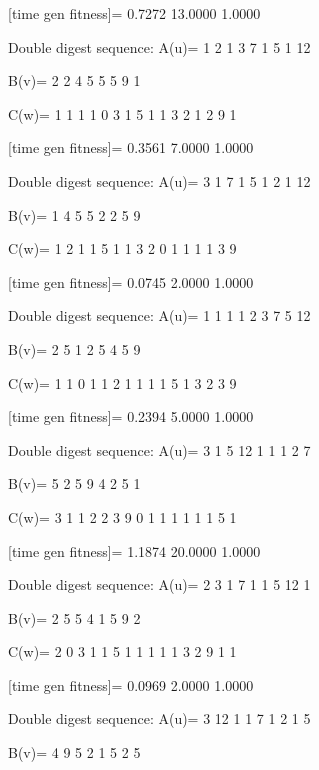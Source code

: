 [time gen fitness]=
    0.7272   13.0000    1.0000

Double digest sequence:
A(u)=
     1     2     1     3     7     1     5     1    12

B(v)=
     2     2     4     5     5     5     9     1

C(w)=
     1     1     1     1     0     3     1     5     1     1     3     2     1     2     9     1

[time gen fitness]=
    0.3561    7.0000    1.0000

Double digest sequence:
A(u)=
     3     1     7     1     5     1     2     1    12

B(v)=
     1     4     5     5     2     2     5     9

C(w)=
     1     2     1     1     5     1     1     3     2     0     1     1     1     1     3     9

[time gen fitness]=
    0.0745    2.0000    1.0000

Double digest sequence:
A(u)=
     1     1     1     1     2     3     7     5    12

B(v)=
     2     5     1     2     5     4     5     9

C(w)=
     1     1     0     1     1     2     1     1     1     1     5     1     3     2     3     9

[time gen fitness]=
    0.2394    5.0000    1.0000

Double digest sequence:
A(u)=
     3     1     5    12     1     1     1     2     7

B(v)=
     5     2     5     9     4     2     5     1

C(w)=
     3     1     1     2     2     3     9     0     1     1     1     1     1     1     5     1

[time gen fitness]=
    1.1874   20.0000    1.0000

Double digest sequence:
A(u)=
     2     3     1     7     1     1     5    12     1

B(v)=
     2     5     5     4     1     5     9     2

C(w)=
     2     0     3     1     1     5     1     1     1     1     1     3     2     9     1     1

[time gen fitness]=
    0.0969    2.0000    1.0000

Double digest sequence:
A(u)=
     3    12     1     1     7     1     2     1     5

B(v)=
     4     9     5     2     1     5     2     5

